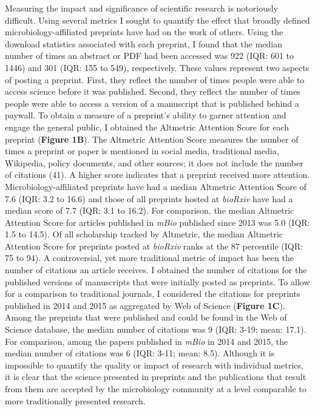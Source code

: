 \documentclass[11,]{article}
\begin{document}
Measuring the impact and significance of scientific research is
notoriously difficult. Using several metrics I sought to quantify the
effect that broadly defined microbiology-affiliated preprints have had
on the work of others. Using the download statistics associated with
each preprint, I found that the median number of times an abstract or
PDF had been accessed was 922 (IQR: 601 to 1446) and 301 (IQR: 155 to
549), respectively. These values represent two aspects of posting a
preprint. First, they reflect the number of times people were able to
access science before it was published. Second, they reflect the number
of times people were able to access a version of a manuscript that is
published behind a paywall. To obtain a measure of a preprint's ability
to garner attention and engage the general public, I obtained the
Altmetric Attention Score for each preprint (\textbf{Figure 1B}). The
Altmetric Attention Score measures the number of times a preprint or
paper is mentioned in social media, traditional media, Wikipedia, policy
documents, and other sources; it does not include the number of
citations (41). A higher score indicates that a preprint received more
attention. Microbiology-affiliated preprints have had a median Altmetric
Attention Score of 7.6 (IQR: 3.2 to 16.6) and those of all preprints
hosted at \emph{bioRxiv} have had a median score of 7.7 (IQR: 3.1 to
16.2). For comparison, the median Altmetric Attention Score for articles
published in \emph{mBio} published since 2013 was 5.0 (IQR: 1.5 to
14.5). Of all scholarship tracked by Altmetric, the median Altmetric
Attention Score for preprints posted at \emph{bioRxiv} ranks at the 87
percentile (IQR: 75 to 94). A controversial, yet more traditional metric
of impact has been the number of citations an article receives. I
obtained the number of citations for the published versions of
manuscripts that were initially posted as preprints. To allow for a
comparison to traditional journals, I considered the citations for
preprints published in 2014 and 2015 as aggregated by Web of Science
(\textbf{Figure 1C}). Among the preprints that were published and could
be found in the Web of Science database, the median number of citations
was 9 (IQR: 3-19; mean: 17.1). For comparison, among the papers
published in \emph{mBio} in 2014 and 2015, the median number of
citations was 6 (IQR: 3-11; mean: 8.5). Although it is impossible to
quantify the quality or impact of research with individual metrics, it
is clear that the science presented in preprints and the publications
that result from them are accepted by the microbiology community at a
level comparable to more traditionally presented research.
\end{document}
